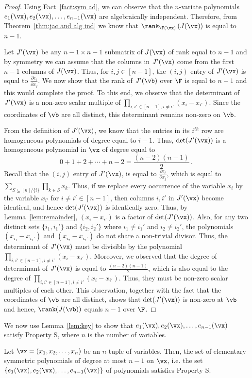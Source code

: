 \begin{proof}
Using Fact~\ref{fact:sym ad}, we can observe that  the $n$-variate polynomials $e_1(\vx), e_2(\vx), \ldots, e_{n-1}(\vx)$ are algebraically independent.
Therefore, from Theorem~\ref{thm:jac and alg ind} we know that $\rank_{\F(\vx)}\left(J(\vx) \right)$ is equal to $n-1$. 

Let $J'(\vx)$ be any $n-1 \times n-1$ submatrix of $J(\vx)$ of rank equal to $n-1$ and by symmetry we can assume that the columns in $J'(\vx)$ come from the first $n-1$ columns of $J(\vx)$. Thus, for $i, j \in [n-1]$, the $(i, j)$ entry of $J'(\vx)$ is equal to $\frac{\partial e_i}{\partial x_j}$. We now show that the rank of $J'(\vb)$ over $\F$ is equal to $n-1$ and this would complete the proof. To this end, we observe that the determinant of $J'(\vx)$ is a non-zero scalar multiple of $\prod_{i, i' \in [n-1], i \neq i'}(x_i-x_{i'})$. Since the coordinates of $\vb$ are all distinct, this determinant remains non-zero on $\vb$. 

From the definition of $J'(\vx)$, we know that the entries in its $i^{th}$ row are homogeneous polynomials of degree equal to $i-1$. Thus, $\det(J'(\vx))$ is a homogeneous polynomial in $\vx$ of degree equal to \[
0 + 1 + 2 + \cdots + n-2 = \frac{(n-2)(n-1)}{2} \, . \] Recall that the $(i, j)$ entry of $J'(\vx)$, is equal to $\frac{\partial e_i}{\partial x_j}$, which is equal to $\sum_{S \subseteq [n]/ \{i\}}\prod_{k \in S} x_k$. Thus, if we replace every occurrence of the variable $x_i$ by the variable $x_{i'}$ for $i \neq i' \in [n-1]$, then columns $i, i'$ in $J'(\vx)$ become identical, and hence $\det(J'(\vx))$ is identically zero. Thus, by Lemma~\ref{lem:remainder}, $(x_i-x_{i'})$ is a factor of $\det(J'(\vx))$. Also, for any two distinct sets $\{i_1, i_1'\}$ and $\{i_2, i_2'\}$ where $i_1 \neq i_1'$ and $i_2 \neq i_2'$, the polynomials $(x_{i_1}-x_{i_1'})$ and $(x_{i_2}-x_{i_2'})$ do not share a non-trivial divisor. Thus, the determinant of $J'(\vx)$ must be divisible by the polynomial $\prod_{i, i' \in [n-1], i \neq i'}(x_i-x_{i'})$. Moreover, we observed that the degree of determinant of $J'(\vx)$ is equal to $\frac{(n-2)(n-1)}{2}$, which is also equal to the degree of $\prod_{i, i' \in [n-1], i \neq i'}(x_i-x_{i'})$. Thus, they must be non-zero scalar multiples of each other. This observation, together with the fact that the coordinates of $\vb$ are all distinct, shows that $\det(J'(\vx))$ is non-zero at $\vb$ and hence, $\rank(J(\vb))$ equals $n-1$ over $\F$.
\end{proof}
We now use Lemma~\ref{lem:key} to show that $e_1(\vx), e_2(\vx), \ldots, e_{n-1}(\vx)$ satisfy Property S, where $n$ is the number of variables.
\begin{lemma}\label{lem:esym prop s}
Let $\vx = (x_1, x_2, \ldots, x_n)$ be an $n$-tuple of variables. Then, the set of elementary symmetric polynomials of degree at most $n-1$ on $\vx$, i.e. the set $\{e_1(\vx), e_2(\vx), \ldots, e_{n-1}(\vx)\}$ of polynomials satisfies Property S. 
\end{lemma}

